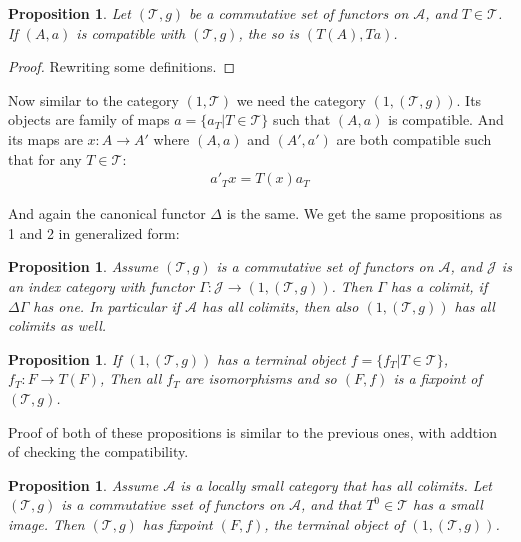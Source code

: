 \documentclass[12pt]{article}
\newcounter{the}
\newtheorem{proposition}[the]{Proposition}
\begin{document}
\begin{proposition}
    Let $(\mathscr T, g)$ be a commutative set of functors on $\mathscr A$, and $T \in \mathscr T$. If $(A, a)$ is compatible with $(\mathscr T, g)$, the so is $(T(A), T a)$.
\end{proposition}
\begin{proof}
    Rewriting some definitions.
\end{proof}

Now similar to the category $(1, \mathscr T)$ we need the category $(1, (\mathscr T, g))$. Its objects are family of maps $a = \{a_T | T \in \mathscr T\}$ such that $(A, a)$ is compatible. And its maps are $x: A \to A'$ where $(A, a)$ and $(A', a')$ are both compatible such that for any $T \in \mathscr T$:
\begin{gather*}
    a'_T x = T(x) a_T
\end{gather*}

And again the canonical functor $\Delta$ is the same. We get the same propositions as 1 and 2 in generalized form:

\begin{proposition}
    Assume $(\mathscr T, g)$ is a commutative set of functors on $\mathscr A$, and $\mathscr J$ is an index category with functor $\Gamma: \mathscr J \to (1, (\mathscr T, g))$. Then $\Gamma$ has a colimit, if $\Delta \Gamma$ has one. In particular if $\mathscr A$ has all colimits, then also $(1, (\mathscr T, g))$ has all colimits as well.
\end{proposition}

\begin{proposition}
    If $(1, (\mathscr T, g))$ has a terminal object $f = \{f_T | T \in \mathscr T\}$, $f_T: F \to T(F)$, Then all $f_T$ are isomorphisms and so $(F, f)$ is a fixpoint of $(\mathscr T, g)$.
\end{proposition}

Proof of both of these propositions is similar to the previous ones, with addtion of checking the compatibility.


\begin{proposition}
    Assume $\mathscr A$ is a locally small category that has all colimits. Let $(\mathscr T, g)$ is a commutative sset of functors on $\mathscr A$, and that $T^0 \in \mathscr T$ has a small image. Then $(\mathscr T, g)$ has fixpoint $(F, f)$, the terminal object of $(1, (\mathscr T, g))$.
\end{proposition}
\end{document}
